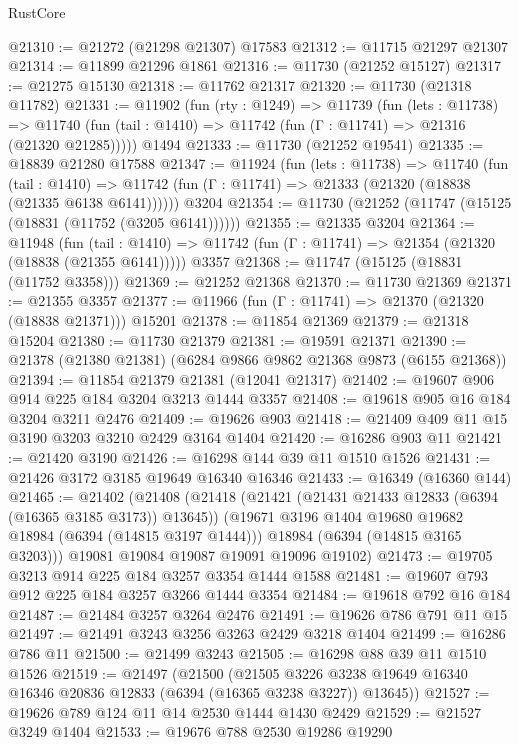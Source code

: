 \begin{lexlean}{RustCore}
\begin{coremodule}
@21310 := @21272 (@21298 @21307) @17583
@21312 := @11715 @21297 @21307
@21314 := @11899 @21296 @1861
@21316 := @11730 (@21252 @15127)
@21317 := @21275 @15130
@21318 := @11762 @21317
@21320 := @11730 (@21318 @11782)
@21331 := @11902
    (fun (rty : @1249) =>
    @11739
      (fun (lets : @11738) =>
      @11740 (fun (tail : @1410) => @11742 (fun (Γ : @11741) => @21316 (@21320 @21285)))))
    @1494
@21333 := @11730 (@21252 @19541)
@21335 := @18839 @21280 @17588
@21347 := @11924
    (fun (lets : @11738) =>
    @11740
      (fun (tail : @1410) =>
      @11742 (fun (Γ : @11741) => @21333 (@21320 (@18838 (@21335 @6138 @6141))))))
    @3204
@21354 := @11730 (@21252 (@11747 (@15125 (@18831 (@11752 (@3205 @6141))))))
@21355 := @21335 @3204
@21364 := @11948
    (fun (tail : @1410) => @11742 (fun (Γ : @11741) => @21354 (@21320 (@18838 (@21355 @6141)))))
    @3357
@21368 := @11747 (@15125 (@18831 (@11752 @3358)))
@21369 := @21252 @21368
@21370 := @11730 @21369
@21371 := @21355 @3357
@21377 := @11966 (fun (Γ : @11741) => @21370 (@21320 (@18838 @21371))) @15201
@21378 := @11854 @21369
@21379 := @21318 @15204
@21380 := @11730 @21379
@21381 := @19591 @21371
@21390 := @21378 (@21380 @21381) (@6284 @9866 @9862 @21368 @9873 (@6155 @21368))
@21394 := @11854 @21379 @21381 (@12041 @21317)
@21402 := @19607 @906 @914 @225 @184 @3204 @3213 @1444 @3357
@21408 := @19618 @905 @16 @184 @3204 @3211 @2476
@21409 := @19626 @903
@21418 := @21409 @409 @11 @15 @3190 @3203 @3210 @2429 @3164 @1404
@21420 := @16286 @903 @11
@21421 := @21420 @3190
@21426 := @16298 @144 @39 @11 @1510 @1526
@21431 := @21426 @3172 @3185 @19649 @16340 @16346
@21433 := @16349 (@16360 @144)
@21465 := @21402
    (@21408
      (@21418
        (@21421 (@21431 @21433 @12833 (@6394 (@16365 @3185 @3173)) @13645))
        (@19671 @3196 @1404 @19680 @19682 @18984 (@6394 (@14815 @3197 @1444)))
        @18984
        (@6394 (@14815 @3165 @3203)))
      @19081
      @19084
      @19087
      @19091
      @19096
      @19102)
@21473 := @19705 @3213 @914 @225 @184 @3257 @3354 @1444 @1588
@21481 := @19607 @793 @912 @225 @184 @3257 @3266 @1444 @3354
@21484 := @19618 @792 @16 @184
@21487 := @21484 @3257 @3264 @2476
@21491 := @19626 @786 @791 @11 @15
@21497 := @21491 @3243 @3256 @3263 @2429 @3218 @1404
@21499 := @16286 @786 @11
@21500 := @21499 @3243
@21505 := @16298 @88 @39 @11 @1510 @1526
@21519 := @21497
    (@21500
      (@21505 @3226 @3238 @19649 @16340 @16346 @20836 @12833 (@6394 (@16365 @3238 @3227)) @13645))
@21527 := @19626 @789 @124 @11 @14 @2530 @1444 @1430 @2429
@21529 := @21527 @3249 @1404
@21533 := @19676 @788 @2530 @19286 @19290

\end{coremodule}
\end{lexlean}
